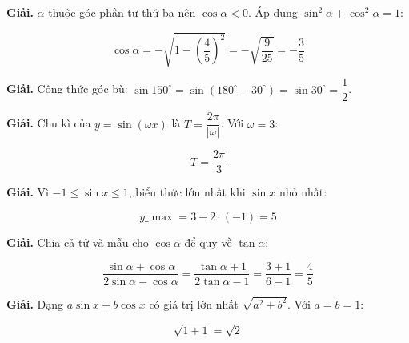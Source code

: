 \documentclass[11pt, a4paper]{article}
\begin{document}
\begin{dapan}[1 — Đáp án B]

\textbf{Giải.} $\alpha$ thuộc góc phần tư thứ ba nên $\cos\alpha < 0$. Áp dụng $\sin^2\alpha + \cos^2\alpha = 1$:

$$\cos\alpha = -\sqrt{1 - \left(\dfrac{4}{5}\right)^2} = -\sqrt{\dfrac{9}{25}} = -\dfrac{3}{5}$$


\end{dapan}
\vspace{0.3cm}
\begin{dapan}[2 — Đáp án A]

\textbf{Giải.} Công thức góc bù: $\sin 150^\circ = \sin(180^\circ - 30^\circ) = \sin 30^\circ = \dfrac{1}{2}$.


\end{dapan}
\vspace{0.3cm}
\begin{dapan}[3 — Đáp án A]

\textbf{Giải.} Chu kì của $y = \sin(\omega x)$ là $T = \dfrac{2\pi}{\lvert \omega \rvert}$. Với $\omega = 3$:

$$T = \dfrac{2\pi}{3}$$


\end{dapan}
\vspace{0.3cm}
\begin{dapan}[4 — Đáp án B]

\textbf{Giải.} Vì $-1 \le \sin x \le 1$, biểu thức lớn nhất khi $\sin x$ nhỏ nhất:

$$y\_{\max} = 3 - 2 \cdot (-1) = 5$$


\end{dapan}
\vspace{0.3cm}
\begin{dapan}[5 — Đáp án B]

\textbf{Giải.} Chia cả tử và mẫu cho $\cos\alpha$ để quy về $\tan\alpha$:

$$\dfrac{\sin\alpha + \cos\alpha}{2\sin\alpha - \cos\alpha} = \dfrac{\tan\alpha + 1}{2\tan\alpha - 1} = \dfrac{3 + 1}{6 - 1} = \dfrac{4}{5}$$


\end{dapan}
\vspace{0.3cm}
\begin{dapan}[6 — Đáp án A]

\textbf{Giải.} Dạng $a\sin x + b\cos x$ có giá trị lớn nhất $\sqrt{a^2 + b^2}$. Với $a = b = 1$:

$$\sqrt{1 + 1} = \sqrt{2}$$


\end{dapan}
\end{document}
